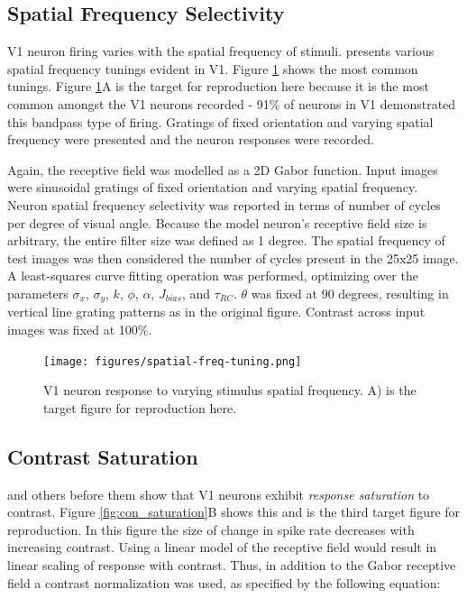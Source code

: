 \documentclass{article}
\begin{document}
\subsection{Spatial Frequency Selectivity}
V1 neuron firing varies with the spatial frequency of stimuli. \citet{foster85} presents various spatial frequency tunings evident in V1. Figure \ref{fig:sftuning} shows the most common tunings. Figure \ref{fig:sftuning}A is the target for reproduction here because it is the most common amongst the V1 neurons recorded - 91\% of neurons in V1 demonstrated this bandpass type of firing. Gratings of fixed orientation and varying spatial frequency were presented and the neuron responses were recorded. 

Again, the receptive field was modelled as a 2D Gabor function. Input images were sinusoidal gratings of fixed orientation and varying spatial frequency. Neuron spatial frequency selectivity was reported in terms of number of cycles per degree of visual angle. Because the model neuron's receptive field size is arbitrary, the entire filter size was defined as 1 degree. The spatial frequency of test images was then considered the number of cycles present in the 25x25 image. A least-squares curve fitting operation was performed, optimizing over the parameters $\sigma_x$, $\sigma_y$, $k$, $\phi$, $\alpha$, $J_{bias}$, and $\tau_{RC}$. $\theta$ was fixed at 90 degrees, resulting in vertical line grating patterns as in the original figure. Contrast across input images was fixed at 100\%.

\begin{figure}[h]
\begin{center}
\texttt{[image: figures/spatial-freq-tuning.png]}
\caption{ V1 neuron response to varying stimulus spatial frequency. A) is the target figure for reproduction here. \cite{foster85}}
\label{fig:sftuning}
\end{center}
\end{figure}

\subsection{Contrast Saturation}

\citet{carandini97} and others before them show that V1 neurons exhibit \emph{response saturation} to contrast. Figure \ref{fig:con_saturation}B shows this and is the third target figure for reproduction. In this figure the size of change in spike rate decreases with increasing contrast. Using a linear model of the receptive field would result in linear scaling of response with contrast. Thus, in addition to the Gabor receptive field a contrast normalization was used, as specified by the following equation:
\end{document}
